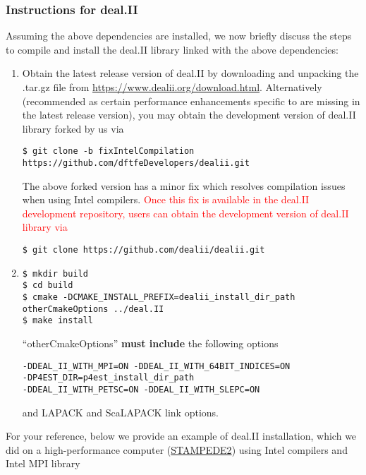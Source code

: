 \subsubsection{Instructions for deal.II}
Assuming the above dependencies are installed, we now briefly discuss the steps to compile and install the deal.II library linked with the above dependencies:
\begin{enumerate}

\item Obtain the latest release version of deal.II by downloading and unpacking the .tar.gz file from \url{https://www.dealii.org/download.html}. Alternatively (recommended as certain performance enhancements specific to \dftfe{} are missing in the latest release version), you may obtain the development version of deal.II library forked by us via
\begin{verbatim}
$ git clone -b fixIntelCompilation https://github.com/dftfeDevelopers/dealii.git
\end{verbatim}
The above forked version has a minor fix which resolves compilation issues when using Intel compilers. \textcolor{red}{Once this fix is available in the deal.II development repository, users can obtain the development version of deal.II library via}
\begin{verbatim}
$ git clone https://github.com/dealii/dealii.git
\end{verbatim}
 

\item
\begin{verbatim}
$ mkdir build
$ cd build
$ cmake -DCMAKE_INSTALL_PREFIX=dealii_install_dir_path otherCmakeOptions ../deal.II
$ make install
\end{verbatim}
``otherCmakeOptions'' {\bf must include} the following options
\begin{verbatim}
-DDEAL_II_WITH_MPI=ON -DDEAL_II_WITH_64BIT_INDICES=ON
-DP4EST_DIR=p4est_install_dir_path
-DDEAL_II_WITH_PETSC=ON -DDEAL_II_WITH_SLEPC=ON
\end{verbatim}
and LAPACK and ScaLAPACK link options. 
\end{enumerate}		
For your reference, below we provide an example of deal.II installation, which we did on a high-performance computer (\href{https://www.tacc.utexas.edu/systems/stampede2}{STAMPEDE2}) using Intel compilers and Intel MPI library
